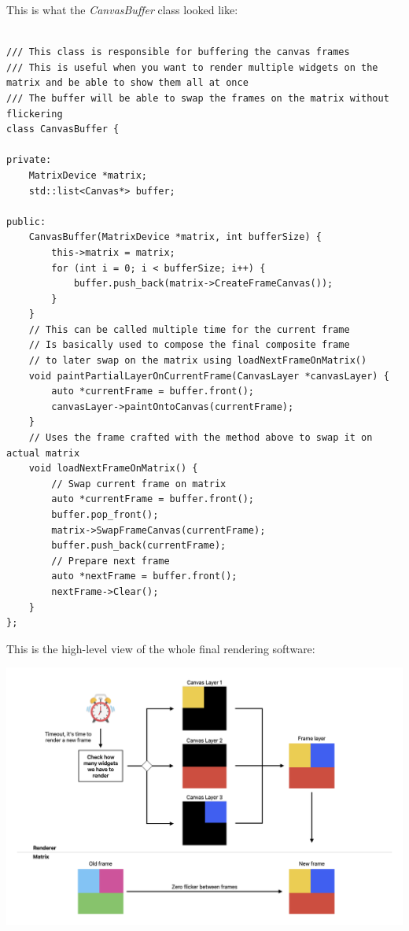 This is what the \textit{CanvasBuffer} class looked like:


\begin{verbatim}

/// This class is responsible for buffering the canvas frames
/// This is useful when you want to render multiple widgets on the matrix and be able to show them all at once
/// The buffer will be able to swap the frames on the matrix without flickering
class CanvasBuffer {

private:
    MatrixDevice *matrix;
    std::list<Canvas*> buffer;

public:
    CanvasBuffer(MatrixDevice *matrix, int bufferSize) {
        this->matrix = matrix;
        for (int i = 0; i < bufferSize; i++) {
            buffer.push_back(matrix->CreateFrameCanvas());
        }
    }
    // This can be called multiple time for the current frame
    // Is basically used to compose the final composite frame
    // to later swap on the matrix using loadNextFrameOnMatrix()
    void paintPartialLayerOnCurrentFrame(CanvasLayer *canvasLayer) {
        auto *currentFrame = buffer.front();
        canvasLayer->paintOntoCanvas(currentFrame);
    }
    // Uses the frame crafted with the method above to swap it on actual matrix
    void loadNextFrameOnMatrix() {
        // Swap current frame on matrix
        auto *currentFrame = buffer.front();
        buffer.pop_front(); 
        matrix->SwapFrameCanvas(currentFrame); 
        buffer.push_back(currentFrame); 
        // Prepare next frame
        auto *nextFrame = buffer.front();
        nextFrame->Clear();
    }
};
\end{verbatim}

\newpage
This is the high-level view of the whole final rendering software:

\includegraphics[width=\textwidth]{tesi/img/software-renderer.png}